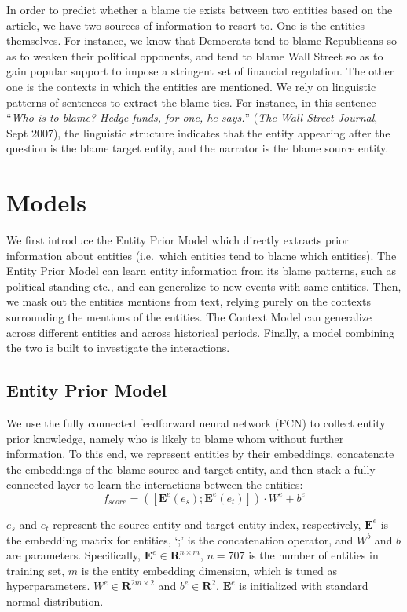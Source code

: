 \documentclass[11pt,a4paper]{article}
\begin{document}
In order to predict whether a blame tie exists between two entities based on the article, we have two sources of information to resort to. One is the entities themselves. For instance, we know that Democrats tend to blame Republicans so as to weaken their political opponents, and tend to blame Wall Street so as to gain popular support to impose a stringent set of financial regulation. The other one is the contexts in which the entities are mentioned. We rely on linguistic patterns of sentences to extract the blame ties. For instance, in this sentence ``{\it Who is to blame? Hedge funds, for one, he says.}'' ({\it The Wall Street Journal}, Sept 2007), the linguistic structure indicates that the entity appearing after the question is the blame target entity, and the narrator is the blame source entity.

\section{Models}

We first introduce the Entity Prior Model which directly extracts prior information about entities (i.e.\ which entities tend to blame which entities). The Entity Prior Model can learn entity information from its blame patterns, such as political standing etc., and can generalize to new events with same entities. Then, we mask out the entities mentions from text, relying purely on the contexts surrounding the mentions of the entities. The Context Model can generalize across different entities and across historical periods. Finally, a model combining the two is built to investigate the interactions.

\subsection{Entity Prior Model}
\label{entitymodel}
We use the fully connected feedforward neural network (FCN) to collect entity prior knowledge, namely who is likely to blame whom without further information. To this end, we represent entities by their embeddings, concatenate the embeddings of the blame source and target entity, and then stack a fully connected layer to learn the interactions between the entities: $$f_{score} = ([\mathbf{E}^e(e_s); \mathbf{E}^e(e_t)]) \cdot W^e + b^e $$

$e_s$ and $e_t$ represent the source entity and target entity index, respectively, $\mathbf{E}^e$ is the embedding matrix for entities, `;' is the concatenation operator, and $W^b$ and $b$ are parameters. Specifically, $\mathbf{E}^e \in \mathbf{R}^{n\times m}$, $n=707$ is the number of entities in training set, $m$ is the entity embedding dimension, which is tuned as hyperparameters. $W^e \in \mathbf{R}^{2m\times 2}$ and $b^e \in \mathbf{R}^{2} $. $\mathbf{E}^e$ is initialized with standard normal distribution.
\end{document}

